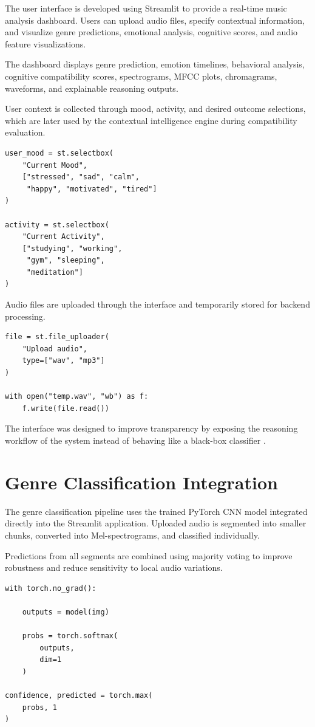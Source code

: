 \documentclass[12pt,a4paper]{report}
\begin{document}
The user interface is developed using Streamlit to provide a real-time music analysis dashboard. Users can upload audio files, specify contextual information, and visualize genre predictions, emotional analysis, cognitive scores, and audio feature visualizations.

The dashboard displays genre prediction, emotion timelines, behavioral analysis, cognitive compatibility scores, spectrograms, MFCC plots, chromagrams, waveforms, and explainable reasoning outputs.

User context is collected through mood, activity, and desired outcome selections, which are later used by the contextual intelligence engine during compatibility evaluation.

\begin{lstlisting}
user_mood = st.selectbox(
    "Current Mood",
    ["stressed", "sad", "calm",
     "happy", "motivated", "tired"]
)

activity = st.selectbox(
    "Current Activity",
    ["studying", "working",
     "gym", "sleeping",
     "meditation"]
)
\end{lstlisting}

Audio files are uploaded through the interface and temporarily stored for backend processing.

\begin{lstlisting}
file = st.file_uploader(
    "Upload audio",
    type=["wav", "mp3"]
)

with open("temp.wav", "wb") as f:
    f.write(file.read())
\end{lstlisting}

The interface was designed to improve transparency by exposing the reasoning workflow of the system instead of behaving like a black-box classifier \cite{r24,r27,r28}.

\section{Genre Classification Integration}

The genre classification pipeline uses the trained PyTorch CNN model integrated directly into the Streamlit application. Uploaded audio is segmented into smaller chunks, converted into Mel-spectrograms, and classified individually.

Predictions from all segments are combined using majority voting to improve robustness and reduce sensitivity to local audio variations.

\begin{lstlisting}
with torch.no_grad():

    outputs = model(img)

    probs = torch.softmax(
        outputs,
        dim=1
    )

confidence, predicted = torch.max(
    probs, 1
)
\end{lstlisting}
\end{document}
